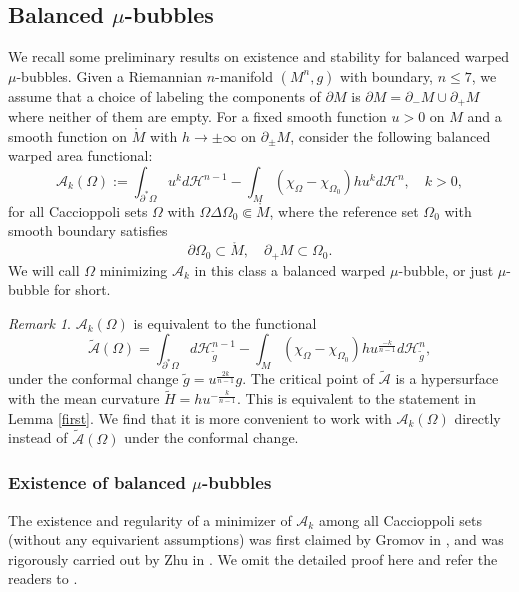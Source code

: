 \documentclass[11pt,letterpaper]{amsart}
\newcommand{\cg}{\widetilde{g}}
\newcommand{\mA}{\mathcal{A}}
\newcommand{\mH}{\mathcal{H}}
\theoremstyle{definition}
\theoremstyle{remark}
\newtheorem{remark}[theorem]{Remark}
\numberwithin{equation}{section}
\begin{document}
\subsection{Balanced $\mu$-bubbles}

We recall some preliminary results on existence and stability for balanced warped $\mu$-bubbles. Given a Riemannian $n$-manifold $(M^n,g)$ with boundary, $n\leqslant 7$, we assume that a choice of labeling the components of $\partial M$ is $\partial M=\partial_-M \cup \partial_+M$ where neither of them are empty. For a fixed smooth function $u>0$ on $M$ and a smooth function on $\mathring{M}$ with $h\to \pm\infty$ on $\partial_{\pm}M$, consider the following balanced warped area functional: 
\begin{equation*}
    \mA_{k}(\Omega):=\int_{\partial^{*}\Omega} u^k d\mH^{n-1}-\int_{M}\left(\chi_{\Omega}-\chi_{\Omega_0}\right)hu^k d\mH^n,\quad k>0,
\end{equation*}
for all Caccioppoli sets $\Omega$ with $\Omega\Delta\Omega_0\Subset \mathring{M}$, where the reference set $\Omega_0$ with smooth boundary satisfies 
\begin{equation*}
    \partial \Omega_0\subset \mathring{M}, \quad \partial_+M\subset \Omega_0. 
\end{equation*}
We will call $\Omega$ minimizing $\mA_{k}$ in this class a balanced warped $\mu$-bubble, or just $\mu$-bubble for short.

\begin{remark}
    $\mA_{k}(\Omega)$ is equivalent to the functional
    \begin{equation*}
        \widetilde{\mA}(\Omega)=\int_{\partial^{*}\Omega} d\mH^{n-1}_{\cg}-\int_{M}\left(\chi_{\Omega}-\chi_{\Omega_0}\right)hu^{\frac{-k}{n-1}} d\mH^n_{\cg},
    \end{equation*}
    under the conformal change $\cg=u^{\frac{2k}{n-1}} g$. The critical point of $\widetilde{\mA}$ is a hypersurface with the mean curvature $\tilde{H}=hu^{-\frac{k}{n-1}}$. This is equivalent to the statement in Lemma \ref{first}. We find that it is more convenient to work with $\mA_{k}(\Omega)$ directly instead of $\widetilde{\mA}(\Omega)$ under the conformal change. 
\end{remark}


\subsubsection{Existence of balanced $\mu$-bubbles}
The existence and regularity of a minimizer of $\mA_{k}$ among all Caccioppoli sets (without any equivarient assumptions) was first claimed by Gromov in \cite{Gromov19}, and was rigorously carried out by Zhu in \cite{Zhu-width-estimate}. We omit the detailed proof here and refer the readers to \cite{chodosh-li-bubble}.
\end{document}
